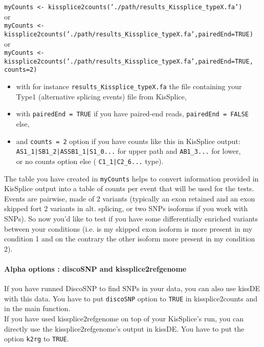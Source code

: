 \documentclass[english, a4paper, 12pt]{article}
\begin{document}
  \texttt{myCounts <- kissplice2counts('./path/results\_Kissplice\_typeX.fa')}\\

or \\
  \texttt{myCounts <- kissplice2counts('./path/results\_Kissplice\_typeX.fa',pairedEnd=TRUE)}\\

or\\
  \texttt{myCounts <- kissplice2counts('./path/results\_Kissplice\_typeX.fa',pairedEnd=TRUE, counts=2)}\\

\begin{itemize}
\item with for instance \texttt{results\_Kissplice\_typeX.fa} the file containing your Type1 (alternative splicing events) file from KisSplice,
 \item  with \texttt{pairedEnd = TRUE} if you have paired-end reads, \texttt{pairedEnd = FALSE} else, 
 \item  and \texttt{counts = 2} option if you have counts like this in KisSplice output:\\
 \texttt{AS1\_1|SB1\_2|ASSB1\_1|S1\_0...} for upper path and \texttt{AB1\_3...} for lower,\\
      or no counts option else ( \texttt{C1\_1|C2\_6...} type).
\end{itemize}

The table you have created in \texttt{myCounts} helps to convert information provided in KisSplice output into a table of counts per event that will be used for the tests.\\
Events are pairwise, made of 2 variants (typically an exon retained and an exon skipped fort 2 variants in alt. splicing, or two SNPs isoforms if you work with SNPs). So now you'd like to test if you have some differentially enriched variants between your conditions (i.e. is my skipped exon isoform is more present in my condition 1 and on the contrary the other isoform more present in my condition 2).

\paragraph{Alpha options : discoSNP and kissplice2refgenome\\}
If you have runned DiscoSNP to find SNPs in your data, you can also use kissDE with this data. You have to put \texttt{discoSNP} option to \texttt{TRUE} in kissplice2counts and in the main function.\\
If you have used kissplice2refgenome on top of your KisSplice's run, you can directly use the kissplice2refgenome's output in kissDE. You have to put the option \texttt{k2rg} to \texttt{TRUE}.
\end{document}
